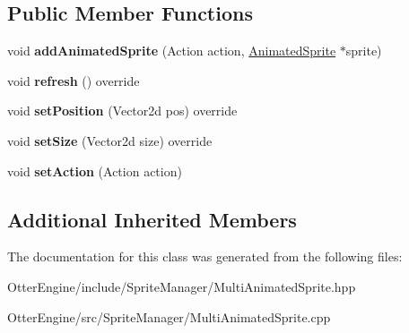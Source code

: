 \subsection*{Public Member Functions}
\begin{DoxyCompactItemize}
\item 
void {\bfseries add\+Animated\+Sprite} (Action action, \hyperlink{class_otter_engine_1_1_animated_sprite}{Animated\+Sprite} $\ast$sprite)\hypertarget{class_otter_engine_1_1_multi_animated_sprite_af7a2fec72b41bcf99c7afbf5205c17b0}{}\label{class_otter_engine_1_1_multi_animated_sprite_af7a2fec72b41bcf99c7afbf5205c17b0}

\item 
void {\bfseries refresh} () override\hypertarget{class_otter_engine_1_1_multi_animated_sprite_a82371d86649ed6efe973d8be7f0d7e82}{}\label{class_otter_engine_1_1_multi_animated_sprite_a82371d86649ed6efe973d8be7f0d7e82}

\item 
void {\bfseries set\+Position} (Vector2d pos) override\hypertarget{class_otter_engine_1_1_multi_animated_sprite_a5154e5f9b7c55e3fc1175a6f4bec90c6}{}\label{class_otter_engine_1_1_multi_animated_sprite_a5154e5f9b7c55e3fc1175a6f4bec90c6}

\item 
void {\bfseries set\+Size} (Vector2d size) override\hypertarget{class_otter_engine_1_1_multi_animated_sprite_a3f410690537a6085a929d9093015cd87}{}\label{class_otter_engine_1_1_multi_animated_sprite_a3f410690537a6085a929d9093015cd87}

\item 
void {\bfseries set\+Action} (Action action)\hypertarget{class_otter_engine_1_1_multi_animated_sprite_a98c1db393ba280d800e473eae4ed6743}{}\label{class_otter_engine_1_1_multi_animated_sprite_a98c1db393ba280d800e473eae4ed6743}

\end{DoxyCompactItemize}
\subsection*{Additional Inherited Members}


The documentation for this class was generated from the following files\+:\begin{DoxyCompactItemize}
\item 
Otter\+Engine/include/\+Sprite\+Manager/Multi\+Animated\+Sprite.\+hpp\item 
Otter\+Engine/src/\+Sprite\+Manager/Multi\+Animated\+Sprite.\+cpp\end{DoxyCompactItemize}
